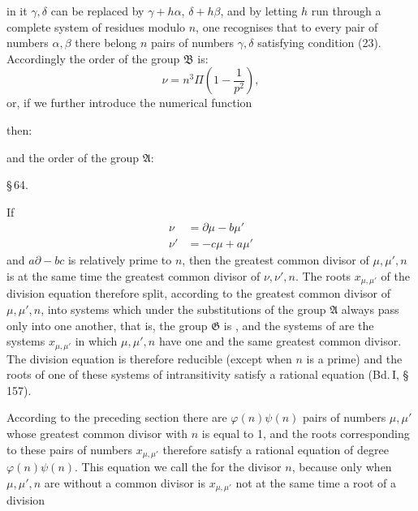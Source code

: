 in it $\gamma, \delta$ can be replaced by $\gamma + h\alpha$, $\delta + h\beta$,
and by letting $h$ run through a complete system of residues modulo $n$,
one recognises that to every pair of numbers $\alpha, \beta$ there belong $n$
pairs of numbers $\gamma, \delta$ satisfying condition (23). Accordingly the
order of the group $\mathfrak{B}$ is:
\[
\nu = n^3 \Pi\left(1 - \frac{1}{p^2}\right),
\]
or, if we further introduce the numerical function

then:

and the order of the group $\mathfrak{A}$:


\begin{center}
\S\,64. 
\end{center}
If
\[
\begin{aligned}
\nu &= \partial\mu - b\mu'\\
\nu' &= -c\mu + a\mu'
\end{aligned}
\]
and $a\partial - bc$ is relatively prime to $n$, then the greatest common
divisor of $\mu, \mu', n$ is at the same time the greatest common
divisor of $\nu, \nu', n$. The roots $x_{\mu,\mu'}$ of the division equation
therefore split, according to the greatest common divisor of
$\mu, \mu', n$, into systems which under the substitutions of the group $\mathfrak{A}$
always pass only into one another, that is, the group $\mathfrak{G}$ is , %
and the systems of  are the
systems $x_{\mu,\mu'}$ in which $\mu, \mu', n$ have one and the same greatest
common divisor. The division equation is therefore
reducible (except when $n$ is a prime) and the roots
of one of these systems of intransitivity %
satisfy a rational
equation (Bd.\,I, \S\,157).

According to the preceding section there are $\varphi(n)\psi(n)$
pairs of numbers $\mu, \mu'$ whose greatest common divisor with $n$
is equal to 1, and the roots corresponding to these pairs of numbers
$x_{\mu,\mu'}$ therefore satisfy a rational equation of degree $\varphi(n)\psi(n)$.
This equation we call the 
for the divisor $n$, because only when $\mu, \mu', n$ are without a common
divisor is $x_{\mu,\mu'}$ not at the same time a root of a division
